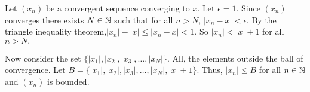 \documentclass{report}
\begin{document}
\begin{myproof}
Let $(x_n)$ be a convergent sequence converging to $x$. Let $\epsilon =1.$ Since $(x_n)$ converges there exists $N \in \NN$ such that for all $n> N$, $|x_n - x| <\epsilon.$ By the triangle inequality theorem,$|x_n| - |x| \leq |x_n -x| < 1.$ So $|x_n|< |x| +1$ for all $n >N.$
\par 
Now consider the set $\{|x_1|, |x_2|, |x_3|,\dots, |x_N|\}.$ All, the elements outside the ball of convergence.  Let $B= \{|x_1|, |x_2|, |x_3|,\dots, |x_N|, |x| + 1\}.$ Thus, $|x_n| \leq B$ for all $n \in \NN$ and $(x_n)$ is bounded.
    
\end{myproof}
\pagebreak




















 
\end{document}
